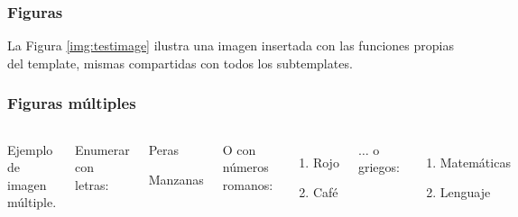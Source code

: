 \begin{frame}
	\frametitle{Figuras}
	La Figura \ref{img:testimage} ilustra una imagen insertada con las funciones propias del template, mismas compartidas con todos los subtemplates.
	
\end{frame}


\begin{frame}
	\frametitle{Figuras múltiples}
	\begin{columns}[c]
		
		\begin{images}{Ejemplo de imagen múltiple.}
			\imagesnewline
		\end{images}
	
		
		Enumerar con letras:
		
		\begin{enumeratebf}[label=\alph*) ] %
			\item Peras
			\item Manzanas
		\end{enumeratebf}
		
		O con números romanos:
		
		\begin{enumerate}[label=\roman*) ]
			\item Rojo
			\item Café
		\end{enumerate}
	
		$\ldots$ o griegos:
		
		\begin{enumerate}[label=\greek*) ]
			\item Matemáticas
			\item Lenguaje
		\end{enumerate}
	
	\end{columns}
\end{frame}


